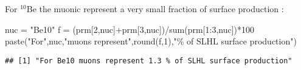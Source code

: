 \documentclass[
]{book}
\newenvironment{Shaded}{\begin{snugshade}}{\end{snugshade}}
\newcommand{\DecValTok}[1]{\textcolor[rgb]{0.00,0.00,0.81}{#1}}
\newcommand{\FunctionTok}[1]{\textcolor[rgb]{0.00,0.00,0.00}{#1}}
\newcommand{\NormalTok}[1]{#1}
\newcommand{\OtherTok}[1]{\textcolor[rgb]{0.56,0.35,0.01}{#1}}
\newcommand{\SpecialCharTok}[1]{\textcolor[rgb]{0.00,0.00,0.00}{#1}}
\newcommand{\StringTok}[1]{\textcolor[rgb]{0.31,0.60,0.02}{#1}}
\begin{document}
For \(^{10}\)Be the muonic represent a very small fraction of surface production :

\begin{Shaded}
\begin{Highlighting}[]
\NormalTok{nuc }\OtherTok{=} \StringTok{"Be10"}
\NormalTok{f }\OtherTok{=}\NormalTok{ (prm[}\DecValTok{2}\NormalTok{,nuc]}\SpecialCharTok{+}\NormalTok{prm[}\DecValTok{3}\NormalTok{,nuc])}\SpecialCharTok{/}\FunctionTok{sum}\NormalTok{(prm[}\DecValTok{1}\SpecialCharTok{:}\DecValTok{3}\NormalTok{,nuc])}\SpecialCharTok{*}\DecValTok{100}
\FunctionTok{paste}\NormalTok{(}\StringTok{"For"}\NormalTok{,nuc,}\StringTok{"muons represent"}\NormalTok{,}\FunctionTok{round}\NormalTok{(f,}\DecValTok{1}\NormalTok{),}\StringTok{"\% of SLHL surface production"}\NormalTok{)}
\end{Highlighting}
\end{Shaded}

\begin{verbatim}
## [1] "For Be10 muons represent 1.3 % of SLHL surface production"
\end{verbatim}
\end{document}
